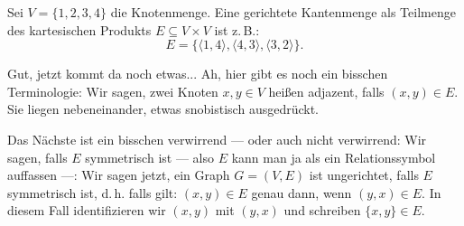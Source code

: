 \begin{math-stroke}
Sei $V = \{1, 2, 3, 4\}$ die Knotenmenge. Eine gerichtete Kantenmenge als Teilmenge des kartesischen Produkts $E \subseteq V \times V$ ist z.\,B.:
\[
E = \bigl\{ \langle 1, 4 \rangle, \langle 4, 3 \rangle, \langle 3, 2 \rangle \bigr\}.
\]

\begin{center}
\end{center}
\end{math-stroke}

\begin{spoken-clean}[00:16:00 - 00:17:26]
Gut, jetzt kommt da noch etwas... Ah, hier gibt es noch ein bisschen Terminologie: Wir sagen, zwei Knoten $x, y \in V$ heißen adjazent, falls $(x, y) \in E$. Sie liegen nebeneinander, etwas snobistisch ausgedrückt.

Das Nächste ist ein bisschen verwirrend --- oder auch nicht verwirrend: Wir sagen, falls $E$ symmetrisch ist --- also $E$ kann man ja als ein Relationssymbol auffassen ---: Wir sagen jetzt, ein Graph $G = (V, E)$ ist ungerichtet, falls $E$ symmetrisch ist, d.\,h. falls gilt: $(x, y) \in E$ genau dann, wenn $(y, x) \in E$. In diesem Fall identifizieren wir $(x, y)$ mit $(y, x)$ und schreiben $\{x, y\} \in E$.
\end{spoken-clean}

